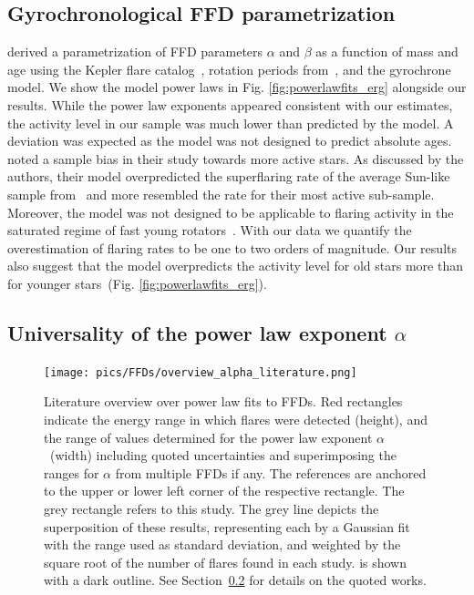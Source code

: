 \documentclass{aa}
\begin{document}
\subsection{Gyrochronological FFD parametrization}
\label{sec:davenport}
\citet{davenport2019} derived a parametrization of FFD parameters $\alpha$ and $\beta$ as a function of mass and age using the Kepler flare catalog~\citep{davenport_kepler_2016}, rotation periods from~\citet{mcquillan2014}, and the \citet{mamajek2008} gyrochrone model. We show the model power laws in Fig. \ref{fig:powerlawfits_erg} alongside our results. While the power law exponents appeared consistent with our estimates, the activity level in our sample was much lower than predicted by the model. A deviation was expected as the model was not designed to predict absolute ages. \citet{davenport2019} noted a sample bias in their study towards more active stars. As discussed by the authors, their model overpredicted the superflaring rate of the average Sun-like sample from~\citet{shibayama2013} and more resembled the rate for their most active sub-sample. Moreover, the model was not designed to be applicable to flaring activity in the saturated regime of fast young rotators~\citep{jackman2020}. With our data we quantify the overestimation of flaring rates to be one to two orders of magnitude. Our results also suggest that the model overpredicts the activity level for old stars more than for younger stars~(Fig. \ref{fig:powerlawfits_erg}). 
\subsection{Universality of the power law exponent $\alpha$}
\label{sec:sec:universal}
   \begin{figure}[t!]
   \centering
            \texttt{[image: pics/FFDs/overview\_alpha\_literature.png]}
         \caption{Literature overview over power law fits to FFDs. Red rectangles indicate the energy range in which flares were detected (height), and the range of values determined for the power law exponent $\alpha$~(width) including quoted uncertainties and superimposing the ranges for $\alpha$ from multiple FFDs if any. The references are anchored to the upper or lower left corner of the respective rectangle. The grey rectangle refers to this study. The grey line depicts the superposition of these results, representing each by a Gaussian fit with the range used as standard deviation, and weighted by the square root of the number of flares found in each study.  is shown with a dark outline. See Section~\ref{sec:sec:universal} for details on the quoted works.
}
          \label{fig:powerlaw_literature}
     
   \end{figure}
\end{document}
